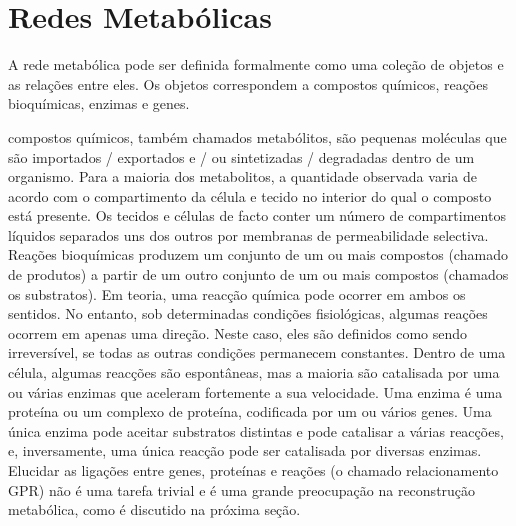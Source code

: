\chapter{Redes Metabólicas}




\indent A rede metabólica pode ser definida formalmente como uma coleção de objetos e as relações entre eles. Os objetos correspondem a compostos químicos, reações bioquímicas, enzimas e genes.

\indent compostos químicos, também chamados metabólitos, são pequenas moléculas que são importados / exportados e / ou sintetizadas / degradadas dentro de um organismo. Para a maioria dos metabolitos, a quantidade observada varia de acordo com o compartimento da célula e tecido no interior do qual o composto está presente. Os tecidos e células de facto conter um número de compartimentos líquidos separados uns dos outros por membranas de permeabilidade selectiva. \\

\indent Reações bioquímicas produzem um conjunto de um ou mais compostos (chamado de produtos) a partir de um outro conjunto de um ou mais compostos (chamados os substratos). Em teoria, uma reacção química pode ocorrer em ambos os sentidos. No entanto, sob determinadas condições fisiológicas, algumas reações ocorrem em apenas uma direção. Neste caso, eles são definidos como sendo irreversível, se todas as outras condições permanecem constantes. Dentro de uma célula, algumas reacções são espontâneas, mas a maioria são catalisada por uma ou várias enzimas que aceleram fortemente a sua velocidade. Uma enzima é uma proteína ou um complexo de proteína, codificada por um ou vários genes. Uma única enzima pode aceitar substratos distintas e pode catalisar a várias reacções, e, inversamente, uma única reacção pode ser catalisada por diversas enzimas. Elucidar as ligações entre genes, proteínas e reações (o chamado relacionamento GPR) não é uma tarefa trivial e é uma grande preocupação na reconstrução metabólica, como é discutido na próxima seção. \\


